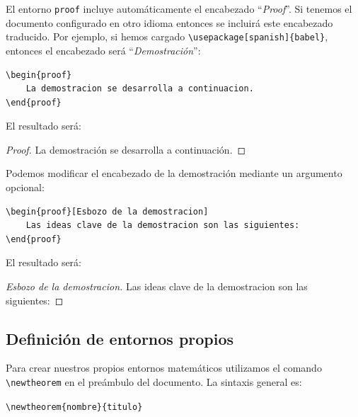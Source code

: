 \documentclass[11pt,a4paper]{article}
\theoremstyle{plain}
\theoremstyle{definition}
\theoremstyle{remark}
\theoremstyle{exercise}
\begin{document}
\medskip

\noindent El entorno \verb|proof| incluye automáticamente el encabezado ``\emph{Proof}''. Si tenemos el documento configurado en otro idioma entonces se incluirá este encabezado traducido. Por ejemplo, si hemos cargado \verb|\usepackage[spanish]{babel}|, entonces el encabezado será ``\emph{Demostración}'':

\begin{lstlisting}
\begin{proof}
    La demostracion se desarrolla a continuacion.
\end{proof}
\end{lstlisting}

\noindent El resultado será:

\begin{paginarecuadrada}
\begin{proof}
    La demostración se desarrolla a continuación.
\end{proof}
\end{paginarecuadrada}

\noindent Podemos modificar el encabezado de la demostración mediante un argumento opcional:

\begin{lstlisting}
\begin{proof}[Esbozo de la demostracion]
    Las ideas clave de la demostracion son las siguientes:
\end{proof}
\end{lstlisting}

\noindent El resultado será:

\begin{paginarecuadrada}
\begin{proof}[Esbozo de la demostracion]
    Las ideas clave de la demostracion son las siguientes:
\end{proof}
\end{paginarecuadrada}

\subsection{Definición de entornos propios}

Para crear nuestros propios entornos matemáticos utilizamos el comando \verb|\newtheorem| en el preámbulo del documento. La sintaxis general es:

\begin{center}
    \verb|\newtheorem{nombre}{titulo}|
\end{center}
\end{document}
